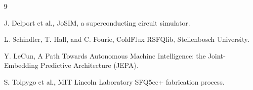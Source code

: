 \documentclass[11pt]{article}
\begin{document}
\begin{thebibliography}{9}

J. Delport et al., JoSIM, a superconducting circuit simulator.

L. Schindler, T. Hall, and C. Fourie, ColdFlux RSFQlib, Stellenbosch University.

Y. LeCun, A Path Towards Autonomous Machine Intelligence: the Joint-Embedding Predictive Architecture (JEPA).

S. Tolpygo et al., MIT Lincoln Laboratory SFQ5ee+ fabrication process.

\end{thebibliography}
\end{document}
